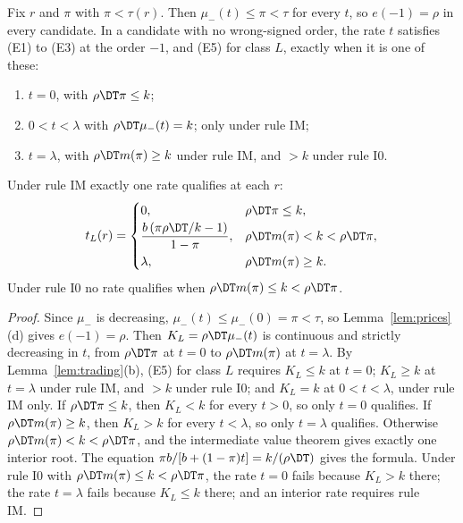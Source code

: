 \begin{lemma}\label{lem:a4-low}
Fix \(r\) and \(\pi\) with \(\pi<\tau(r)\). Then \(\mu_-(t)\le\pi<\tau\) for every \(t\), so \(e(-1)=\rho\) in
every candidate. In a candidate with no wrong-signed order, the rate \(t\) satisfies (E1) to (E3) at the order
\(-1\), and (E5) for class \(L\), exactly when it is one of these:
\begin{enumerate}[leftmargin=2.5em]
\item[(N)] \(t=0\), with \(\rho\DT\pi\le k\);
\item[(Q)] \(0<t<\lambda\) with \(\rho\DT\mu_-(t)=k\); only under rule IM;
\item[(F)] \(t=\lambda\), with \(\rho\DT m(\pi)\ge k\) under rule IM, and \(>k\) under rule I0.
\end{enumerate}
Under rule IM exactly one rate qualifies at each \(r\):
\[
t_L(r)=\begin{cases}0, & \rho\DT\pi\le k,\\[2pt]
\dfrac{b\,(\pi\rho\DT/k-1)}{1-\pi}, & \rho\DT m(\pi)<k<\rho\DT\pi,\\[6pt]
\lambda, & \rho\DT m(\pi)\ge k.\end{cases}
\]
Under rule I0 no rate qualifies when \(\rho\DT m(\pi)\le k<\rho\DT\pi\).
\end{lemma}

\begin{proof}
Since \(\mu_-\) is decreasing, \(\mu_-(t)\le\mu_-(0)=\pi<\tau\), so Lemma~\ref{lem:prices}(d) gives \(e(-1)=\rho\).
Then \(K_L=\rho\DT\mu_-(t)\) is continuous and strictly decreasing in \(t\), from \(\rho\DT\pi\) at \(t=0\) to
\(\rho\DT m(\pi)\) at \(t=\lambda\). By Lemma~\ref{lem:trading}(b), (E5) for class \(L\) requires \(K_L\le k\) at
\(t=0\); \(K_L\ge k\) at \(t=\lambda\) under rule IM, and \(>k\) under rule I0; and \(K_L=k\) at
\(0<t<\lambda\), under rule IM only. If \(\rho\DT\pi\le k\), then \(K_L<k\) for every \(t>0\), so only \(t=0\)
qualifies. If \(\rho\DT m(\pi)\ge k\), then \(K_L>k\) for every \(t<\lambda\), so only \(t=\lambda\) qualifies.
Otherwise \(\rho\DT m(\pi)<k<\rho\DT\pi\), and the intermediate value theorem gives exactly one interior root. The
equation \(\pi b/[b+(1-\pi)t]=k/(\rho\DT)\) gives the formula. Under rule I0 with
\(\rho\DT m(\pi)\le k<\rho\DT\pi\), the rate \(t=0\) fails because \(K_L>k\) there; the rate \(t=\lambda\)
fails because \(K_L\le k\) there; and an interior rate requires rule IM.
\end{proof}

